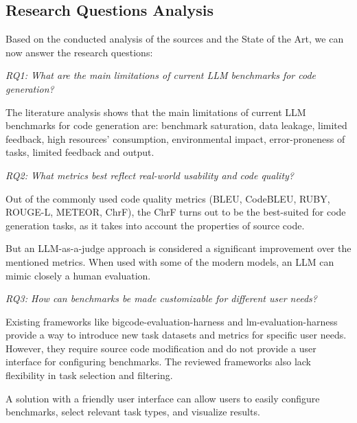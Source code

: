 \subsection{Research Questions Analysis}

Based on the conducted analysis of the sources and the State of the Art, we can now answer the research questions:

\textit{RQ1: What are the main limitations of current LLM benchmarks for code generation?}

The literature analysis shows that the main limitations of current LLM benchmarks for code generation are:
benchmark saturation, data leakage, limited feedback, high resources' consumption,
environmental impact, error-proneness of tasks, limited feedback and output.

\textit{RQ2: What metrics best reflect real-world usability and code quality?}

Out of the commonly used code quality metrics (BLEU, CodeBLEU, RUBY, ROUGE-L, METEOR, ChrF), the ChrF turns out to be the best-suited for code generation tasks, as it takes into account the properties of source code.

But an LLM-as-a-judge approach is considered a significant improvement over the mentioned metrics.
When used with some of the modern models, an LLM can mimic closely a human evaluation.

\textit{RQ3: How can benchmarks be made customizable for different user needs?}

Existing frameworks like bigcode-evaluation-harness and lm-evaluation-harness provide a way to introduce new task datasets and metrics for specific user needs.
However, they require source code modification and do not provide a user interface for configuring benchmarks.
The reviewed frameworks also lack flexibility in task selection and filtering.

A solution with a friendly user interface can allow users to easily configure benchmarks, select relevant task types, and visualize results.

